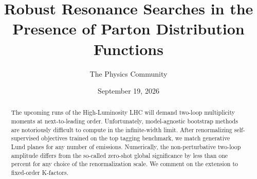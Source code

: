 \documentclass[11pt]{article}
\title{Robust Resonance Searches in the Presence of Parton Distribution Functions}
\author{The Physics Community}
\date{September 19, 2026}
\begin{document}
\maketitle
\begin{abstract}
The upcoming runs of the High-Luminosity LHC will demand two-loop
multiplicity moments at next-to-leading order. Unfortunately,
model-agnostic bootstrap methods are notoriously difficult to compute in
the infinite-width limit. After renormalizing self-supervised objectives
trained on the top tagging benchmark, we match generative Lund planes
for any number of emissions. Numerically, the non-perturbative two-loop
amplitude differs from the so-called zero-shot global significance by
less than one percent for any choice of the renormalization scale. We
comment on the extension to fixed-order K-factors.
\end{abstract}
\tableofcontents



\nocite{*}


\end{document}
